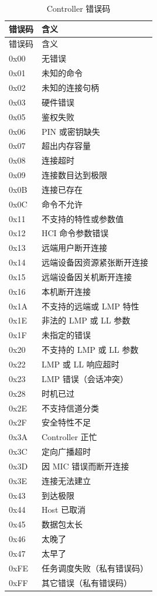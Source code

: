 \documentclass[
  12pt,
]{book}
\begin{document}
\begin{longtable}[]{@{}ll@{}}
\caption{\label{tab:ch0-ctrl-err-code} Controller 错误码}\tabularnewline
\toprule()
错误码 & 含义 \\
\midrule()
\endfirsthead
\toprule()
错误码 & 含义 \\
\midrule()
\endhead
0x00 & 无错误 \\
0x01 & 未知的命令 \\
0x02 & 未知的连接句柄 \\
0x03 & 硬件错误 \\
0x05 & 鉴权失败 \\
0x06 & PIN 或密钥缺失 \\
0x07 & 超出内存容量 \\
0x08 & 连接超时 \\
0x09 & 连接数目达到极限 \\
0x0B & 连接已存在 \\
0x0C & 命令不允许 \\
0x11 & 不支持的特性或参数值 \\
0x12 & HCI 命令参数错误 \\
0x13 & 远端用户断开连接 \\
0x14 & 远端设备因资源紧张断开连接 \\
0x15 & 远端设备因关机断开连接 \\
0x16 & 本机断开连接 \\
0x1A & 不支持的远端或 LMP 特性 \\
0x1E & 非法的 LMP 或 LL 参数 \\
0x1F & 未指定的错误 \\
0x20 & 不支持的 LMP 或 LL 参数 \\
0x22 & LMP 或 LL 响应超时 \\
0x23 & LMP 错误（会话冲突） \\
0x28 & 时机已过 \\
0x2E & 不支持信道分类 \\
0x2F & 安全特性不足 \\
0x3A & Controller 正忙 \\
0x3C & 定向广播超时 \\
0x3D & 因 MIC 错误而断开连接 \\
0x3E & 连接无法建立 \\
0x43 & 到达极限 \\
0x44 & Host 已取消 \\
0x45 & 数据包太长 \\
0x46 & 太晚了 \\
0x47 & 太早了 \\
0xFE & 任务调度失败（私有错误码） \\
0xFF & 其它错误（私有错误码） \\
\bottomrule()
\end{longtable}
\end{document}
